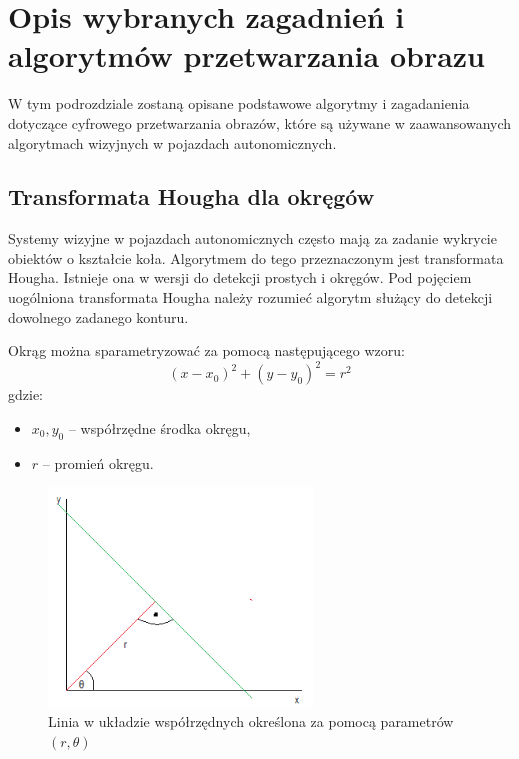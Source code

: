

\section{Opis wybranych zagadnień i algorytmów przetwarzania obrazu}
\label{sec:vision_algs}
W tym podrozdziale zostaną opisane podstawowe algorytmy i zagadanienia dotyczące cyfrowego przetwarzania obrazów, które są używane w zaawansowanych algorytmach wizyjnych w pojazdach autonomicznych. %

\subsection{Transformata Hougha dla okręgów}

Systemy wizyjne w pojazdach autonomicznych często mają za zadanie wykrycie obiektów o kształcie koła. Algorytmem do tego przeznaczonym jest transformata Hougha. 
Istnieje ona w wersji do detekcji prostych i okręgów. 
Pod pojęciem uogólniona transformata Hougha należy rozumieć algorytm służący do detekcji dowolnego zadanego konturu.

Okrąg można sparametryzować za pomocą następującego wzoru:
\begin{equation}
(x-x_0)^2+(y-y_0)^2=r^2
\end{equation}
gdzie:
\begin{itemize}
\item $x_0, y_0$ -- współrzędne środka okręgu,
\item $r$ -- promień okręgu.
\end{itemize}

\begin{figure}[h]
\centering
\includegraphics[width=7cm]{img/hough.png}
\caption{Linia w układzie współrzędnych określona za pomocą parametrów $(r, \theta)$}
\label{fig:hough}
\end{figure}

